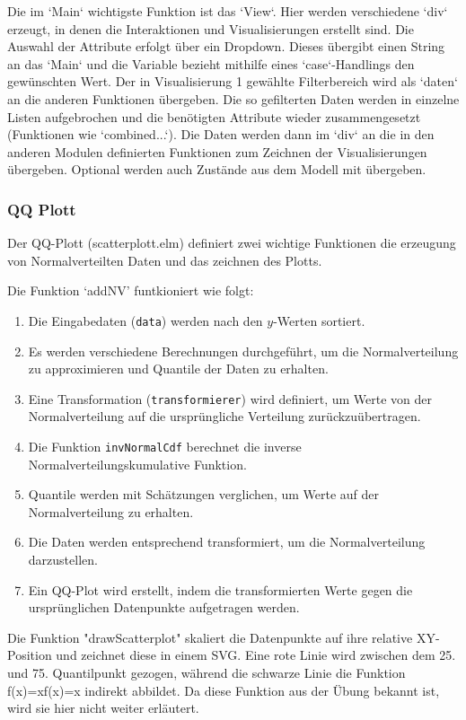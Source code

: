 \documentclass[usegeometry=true]{scrartcl}
\begin{document}
Die im `Main` wichtigste Funktion ist das `View`. Hier werden verschiedene `div` erzeugt, in denen die Interaktionen und Visualisierungen erstellt sind. Die Auswahl der Attribute erfolgt über ein Dropdown. Dieses übergibt einen String an das `Main` und die Variable bezieht mithilfe eines `case`-Handlings den gewünschten Wert. Der in Visualisierung 1 gewählte Filterbereich wird als `daten` an die anderen Funktionen übergeben. Die so gefilterten Daten werden in einzelne Listen aufgebrochen und die benötigten Attribute wieder zusammengesetzt (Funktionen wie `combined...`). Die Daten werden dann im `div` an die in den anderen Modulen definierten Funktionen zum Zeichnen der Visualisierungen übergeben. Optional werden auch Zustände aus dem Modell mit übergeben.

\subsubsection{QQ Plott}
Der QQ-Plott (scatterplott.elm) definiert zwei wichtige Funktionen die erzeugung von Normalverteilten Daten und das zeichnen des Plotts.

Die Funktion `addNV' funtkioniert wie folgt:
\begin{enumerate}
  \item Die Eingabedaten (\texttt{data}) werden nach den $y$-Werten sortiert.
  \item Es werden verschiedene Berechnungen durchgeführt, um die Normalverteilung zu approximieren und Quantile der Daten zu erhalten.
  \item Eine Transformation (\texttt{transformierer}) wird definiert, um Werte von der Normalverteilung auf die ursprüngliche Verteilung zurückzuübertragen.
  \item Die Funktion \texttt{invNormalCdf} berechnet die inverse Normalverteilungskumulative Funktion.
  \item Quantile werden mit Schätzungen verglichen, um Werte auf der Normalverteilung zu erhalten.
  \item Die Daten werden entsprechend transformiert, um die Normalverteilung darzustellen.
  \item Ein QQ-Plot wird erstellt, indem die transformierten Werte gegen die ursprünglichen Datenpunkte aufgetragen werden.
\end{enumerate}

Die Funktion "drawScatterplot" skaliert die Datenpunkte auf ihre relative XY-Position und zeichnet diese in einem SVG. Eine rote Linie wird zwischen dem 25. und 75. Quantilpunkt gezogen, während die schwarze Linie die Funktion f(x)=xf(x)=x indirekt abbildet. Da diese Funktion aus der Übung bekannt ist, wird sie hier nicht weiter erläutert.
\end{document}
